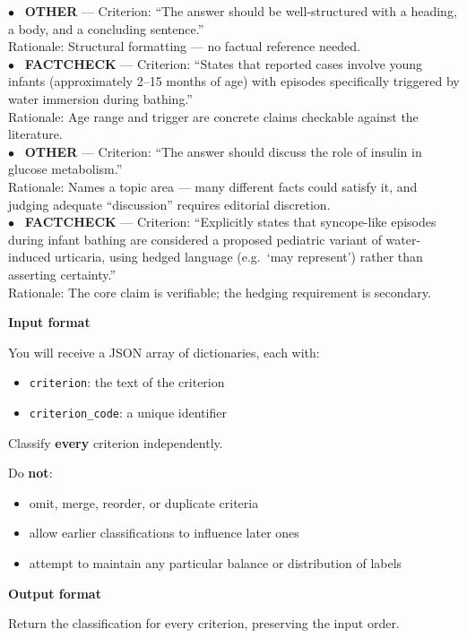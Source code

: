 \documentclass{article}
\begin{document}
\begin{promptbox}
$\bullet$~ \textbf{OTHER} --- Criterion: ``The answer should be well-structured with a heading, a body, and a concluding sentence.'' \\
Rationale: Structural formatting --- no factual reference needed. \\

$\bullet$~ \textbf{FACTCHECK} --- Criterion: ``States that reported cases involve young infants (approximately 2--15 months of age) with episodes specifically triggered by water immersion during bathing.'' \\
Rationale: Age range and trigger are concrete claims checkable against the literature. \\

$\bullet$~ \textbf{OTHER} --- Criterion: ``The answer should discuss the role of insulin in glucose metabolism.'' \\
Rationale: Names a topic area --- many different facts could satisfy it, and judging adequate ``discussion'' requires editorial discretion. \\

$\bullet$~ \textbf{FACTCHECK} --- Criterion: ``Explicitly states that syncope-like episodes during infant bathing are considered a proposed pediatric variant of water-induced urticaria, using hedged language (e.g.\ `may represent') rather than asserting certainty.'' \\
Rationale: The core claim is verifiable; the hedging requirement is secondary.

\textbf{Input format}

You will receive a JSON array of dictionaries, each with:
\begin{itemize}
    \item \texttt{criterion}: the text of the criterion
    \item \texttt{criterion\_code}: a unique identifier
\end{itemize}

Classify \textbf{every} criterion independently.

Do \textbf{not}:
\begin{itemize}
    \item omit, merge, reorder, or duplicate criteria
    \item allow earlier classifications to influence later ones
    \item attempt to maintain any particular balance or distribution of labels
\end{itemize}

\textbf{Output format}

Return the classification for every criterion, preserving the input order.
\end{promptbox}
\end{document}
